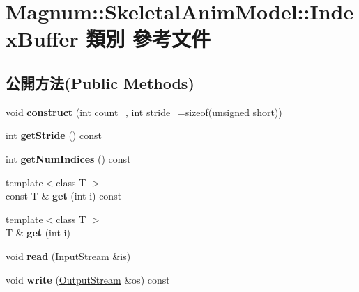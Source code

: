 \hypertarget{class_magnum_1_1_skeletal_anim_model_1_1_index_buffer}{}\section{Magnum\+:\+:Skeletal\+Anim\+Model\+:\+:Index\+Buffer 類別 參考文件}
\label{class_magnum_1_1_skeletal_anim_model_1_1_index_buffer}
\subsection*{公開方法(Public Methods)}
\begin{DoxyCompactItemize}
\item 
void {\bfseries construct} (int count\+\_\+, int stride\+\_\+=sizeof(unsigned short))\hypertarget{class_magnum_1_1_skeletal_anim_model_1_1_index_buffer_a5d361ee7c482462d8c5152b3062a2308}{}\label{class_magnum_1_1_skeletal_anim_model_1_1_index_buffer_a5d361ee7c482462d8c5152b3062a2308}

\item 
int {\bfseries get\+Stride} () const \hypertarget{class_magnum_1_1_skeletal_anim_model_1_1_index_buffer_ab183ebaaf014367fe56e37d90b27c733}{}\label{class_magnum_1_1_skeletal_anim_model_1_1_index_buffer_ab183ebaaf014367fe56e37d90b27c733}

\item 
int {\bfseries get\+Num\+Indices} () const \hypertarget{class_magnum_1_1_skeletal_anim_model_1_1_index_buffer_a54dc23c838678e31294537d23136bd20}{}\label{class_magnum_1_1_skeletal_anim_model_1_1_index_buffer_a54dc23c838678e31294537d23136bd20}

\item 
{\footnotesize template$<$class T $>$ }\\const T \& {\bfseries get} (int i) const \hypertarget{class_magnum_1_1_skeletal_anim_model_1_1_index_buffer_a800b12b9a4e39b8310fc2d9c660c8b13}{}\label{class_magnum_1_1_skeletal_anim_model_1_1_index_buffer_a800b12b9a4e39b8310fc2d9c660c8b13}

\item 
{\footnotesize template$<$class T $>$ }\\T \& {\bfseries get} (int i)\hypertarget{class_magnum_1_1_skeletal_anim_model_1_1_index_buffer_a5b42e1e908fae5866ebd8b5ee7edac3b}{}\label{class_magnum_1_1_skeletal_anim_model_1_1_index_buffer_a5b42e1e908fae5866ebd8b5ee7edac3b}

\item 
void {\bfseries read} (\hyperlink{class_magnum_1_1_input_stream}{Input\+Stream} \&is)\hypertarget{class_magnum_1_1_skeletal_anim_model_1_1_index_buffer_a5b180f0c18ad48b673bc0cfe5d6e05ef}{}\label{class_magnum_1_1_skeletal_anim_model_1_1_index_buffer_a5b180f0c18ad48b673bc0cfe5d6e05ef}

\item 
void {\bfseries write} (\hyperlink{class_magnum_1_1_output_stream}{Output\+Stream} \&os) const \hypertarget{class_magnum_1_1_skeletal_anim_model_1_1_index_buffer_a81e0718ed58f0200a275ff21be297812}{}\label{class_magnum_1_1_skeletal_anim_model_1_1_index_buffer_a81e0718ed58f0200a275ff21be297812}

\end{DoxyCompactItemize}
